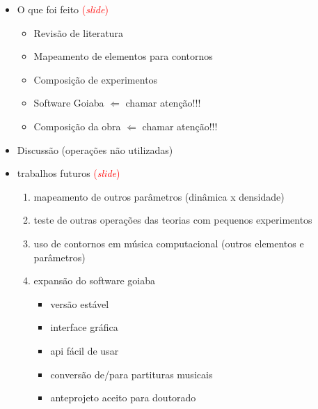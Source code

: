 \documentclass[12pt,a4paper]{article}
\newcommand{\slide}{\textcolor{red}{(\textit{slide})}}
\begin{document}
\begin{itemize}
\item O que foi feito \slide{}
  \begin{itemize}
  \item Revisão de literatura
  \item Mapeamento de elementos para contornos
  \item Composição de experimentos
  \item Software Goiaba $\Longleftarrow$ chamar atenção!!!
  \item Composição da obra $\Longleftarrow$ chamar atenção!!!
  \end{itemize}
\item Discussão (operações não utilizadas)
\item trabalhos futuros \slide{}
  \begin{enumerate}
  \item mapeamento de outros parâmetros (dinâmica x densidade)
  \item teste de outras operações das teorias com pequenos experimentos
  \item uso de contornos em música computacional (outros elementos e parâmetros)
  \item expansão do software goiaba
    \begin{itemize}
    \item versão estável
    \item interface gráfica
    \item api fácil de usar
    \item conversão de/para partituras musicais
    \item anteprojeto aceito para doutorado
    \end{itemize}
  \end{enumerate}
\end{itemize}
\end{document}
